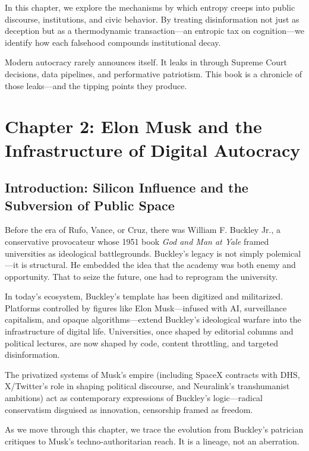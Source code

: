 In this chapter, we explore the mechanisms by which entropy creeps into public discourse, institutions, and civic behavior. By treating disinformation not just as deception but as a thermodynamic transaction—an entropic tax on cognition—we identify how each falsehood compounds institutional decay.

Modern autocracy rarely announces itself. It leaks in through Supreme Court decisions, data pipelines, and performative patriotism. This book is a chronicle of those leaks—and the tipping points they produce.

\newpage

\chapter{Chapter 2: Elon Musk and the Infrastructure of Digital Autocracy}
\section*{Introduction: Silicon Influence and the Subversion of Public Space}
Before the era of Rufo, Vance, or Cruz, there was William F. Buckley Jr., a conservative provocateur whose 1951 book \textit{God and Man at Yale} framed universities as ideological battlegrounds. Buckley’s legacy is not simply polemical—it is structural. He embedded the idea that the academy was both enemy and opportunity. That to seize the future, one had to reprogram the university.

In today's ecosystem, Buckley's template has been digitized and militarized. Platforms controlled by figures like Elon Musk—infused with AI, surveillance capitalism, and opaque algorithms—extend Buckley’s ideological warfare into the infrastructure of digital life. Universities, once shaped by editorial columns and political lectures, are now shaped by code, content throttling, and targeted disinformation.

The privatized systems of Musk’s empire (including SpaceX contracts with DHS, X/Twitter’s role in shaping political discourse, and Neuralink’s transhumanist ambitions) act as contemporary expressions of Buckley’s logic—radical conservatism disguised as innovation, censorship framed as freedom.

As we move through this chapter, we trace the evolution from Buckley’s patrician critiques to Musk’s techno-authoritarian reach. It is a lineage, not an aberration.

